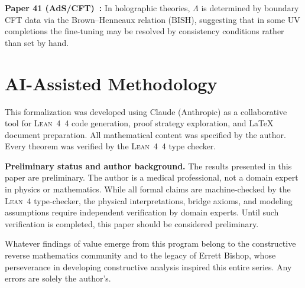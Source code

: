 \documentclass[11pt,a4paper]{article}
\theoremstyle{plain}
\theoremstyle{definition}
\newcommand{\BISH}{\ensuremath{\mathrm{BISH}}}
\newcommand{\Lean}{\textsc{Lean~4}}
\begin{document}
\textbf{Paper 41 (AdS/CFT)~\cite{Lee26P41}:}\quad
In holographic theories, $\Lambda$ is determined by boundary CFT
data via the Brown--Henneaux relation ($\BISH$), suggesting that
in some UV completions the fine-tuning may be resolved by
consistency conditions rather than set by hand.

\section{AI-Assisted Methodology}\label{sec:ai}

This formalization was developed using Claude (Anthropic) as a
collaborative tool for \Lean{}~4 code generation, proof strategy
exploration, and \LaTeX{} document preparation.  All mathematical
content was specified by the author.  Every theorem was verified
by the \Lean{}~4 type checker.

\medskip\noindent
\textbf{Preliminary status and author background.}
The results presented in this paper are preliminary.  The author is a medical
professional, not a domain expert in physics or mathematics.  While all formal
claims are machine-checked by the \Lean{} type-checker, the physical
interpretations, bridge axioms, and modeling assumptions require independent
verification by domain experts.  Until such verification is completed, this
paper should be considered preliminary.

\medskip\noindent
Whatever findings of value emerge from this program belong to the
constructive reverse mathematics community and to the legacy of Errett Bishop,
whose perseverance in developing constructive analysis inspired this entire
series.  Any errors are solely the author's.
\end{document}
